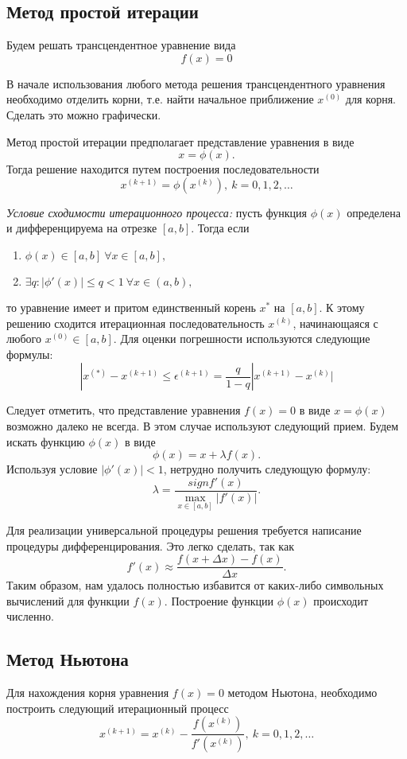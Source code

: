 \documentclass[a4paper,12pt]{article}
\begin{document}
\subsection{Метод простой итерации}
Будем решать трансцендентное уравнение вида
$$
f(x) = 0
$$


В начале использования любого метода решения трансцендентного уравнения
необходимо отделить корни, т.е. найти начальное приближение $x^{(0)}$
для корня. Сделать это можно графически.


Метод простой итерации предполагает представление уравнения в виде
$$
x = \phi(x).
$$
Тогда решение находится путем построения последовательности
$$
x^{(k + 1)} = \phi(x^{(k)}),\ k = 0, 1, 2, \ldots
$$

\textit{Условие сходимости итерационного процесса:} пусть функция $\phi(x)$ определена и дифференцируема на отрезке $[a, b]$. Тогда если
\begin{enumerate}
    \item $\phi(x) \in [a, b]\ \forall x \in [a, b],$
    \item $\exists q: |\phi'(x)| \leq q < 1\ \forall x \in (a, b),$
\end{enumerate}
то уравнение имеет и притом единственный корень $x^{*}$ на $[a, b]$.
К этому решению сходится итерационная последовательность $x^{(k)}$,
начинающаяся с любого $x^{(0)} \in [a, b]$. Для оценки погрешности
используются следующие формулы:
$$
|x^{(*)} - x^{(k + 1)} \leq \epsilon^{(k + 1)} =
    \frac{q}{1 - q} |x^{(k + 1)} - x^{(k)}|
$$

Следует отметить, что представление уравнения $f(x) = 0$ в виде $x = \phi(x)$
возможно далеко не всегда. В этом случае используют следующий прием. Будем
искать функцию $\phi(x)$ в виде
$$
\phi(x) = x + \lambda f(x).
$$
Используя условие $|\phi'(x)| < 1$, нетрудно получить следующую формулу:
$$
\lambda = \frac{sign f'(x)}{\underset{x \in [a, b]}{\max} |f'(x)|}.
$$

Для реализации универсальной процедуры решения требуется
написание процедуры дифференцирования. Это легко сделать, так как
$$
f'(x) \approx \frac{f(x + \Delta x) - f(x)}{\Delta x}.
$$
Таким образом, нам удалось полностью избавится от
каких-либо символьных вычислений для функции $f(x)$. Построение
функции $\phi(x)$ происходит численно.

\subsection{Метод Ньютона}
Для нахождения корня уравнения $f(x) = 0$ методом Ньютона, необходимо
построить следующий итерационный процесс
$$
x^{(k + 1)} = x^{(k)} - \frac{f(x^{(k)})}{f'(x^{(k)})},\ k = 0, 1, 2, \ldots
$$
\end{document}
